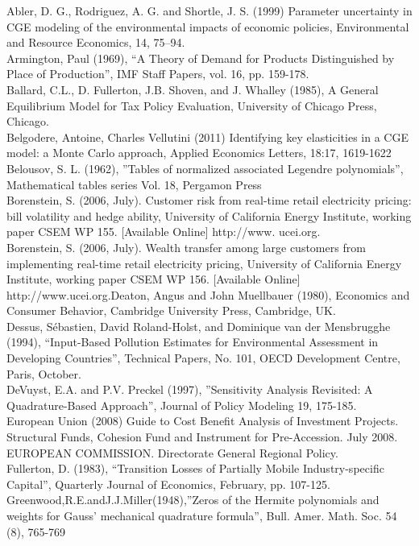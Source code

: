 \documentclass[12pt]{article}
\begin{document}
Abler, D. G., Rodriguez, A. G. and Shortle, J. S. (1999) Parameter uncertainty in CGE modeling of the environmental impacts of economic policies, Environmental and Resource Economics, 14, 75–94.\\
Armington, Paul (1969), “A Theory of Demand for Products Distinguished by Place of Production”,  IMF Staff Papers, vol. 16, pp. 159-178.\\
Ballard, C.L., D. Fullerton, J.B. Shoven, and J. Whalley (1985), A General Equilibrium Model for Tax Policy Evaluation, University of Chicago Press, Chicago.\\
Belgodere, Antoine, Charles Vellutini (2011) Identifying key elasticities in a CGE model: a Monte Carlo approach, Applied Economics Letters, 18:17, 1619-1622\\
Belousov, S. L. (1962), ”Tables of normalized associated Legendre polynomials”, Mathematical tables series Vol. 18, Pergamon Press \\
Borenstein, S. (2006, July). Customer risk from real-time retail electricity pricing: bill volatility and hedge ability, University of California Energy Institute, working paper CSEM WP 155. [Available Online] http://www. ucei.org.\\
Borenstein, S. (2006, July). Wealth transfer among large customers from implementing real-time retail electricity pricing, University of California Energy Institute, working paper CSEM WP 156. [Available Online] http://www.ucei.org.Deaton, Angus and John Muellbauer (1980), Economics and Consumer Behavior, Cambridge University Press, Cambridge, UK.\\
Dessus, Sébastien, David Roland-Holst, and Dominique van der Mensbrugghe (1994), “Input-Based Pollution Estimates for Environmental Assessment in Developing Countries”, Technical Papers, No. 101, OECD Development Centre, Paris, October.\\
DeVuyst, E.A. and P.V. Preckel (1997), ”Sensitivity Analysis Revisited: A Quadrature-Based Approach”, Journal of Policy Modeling 19, 175-185. \\
European Union (2008) Guide to Cost Benefit Analysis of Investment Projects. Structural Funds, Cohesion Fund and Instrument for Pre-Accession. July 2008. EUROPEAN COMMISSION. Directorate General Regional Policy. \\
Fullerton, D. (1983), “Transition Losses of Partially Mobile Industry-specific Capital”, Quarterly Journal of Economics, February, pp. 107-125. \\
Greenwood,R.E.andJ.J.Miller(1948),”Zeros of the Hermite polynomials and weights for Gauss’ mechanical quadrature formula”, Bull. Amer. Math. Soc. 54 (8), 765-769  \\
\end{document}
